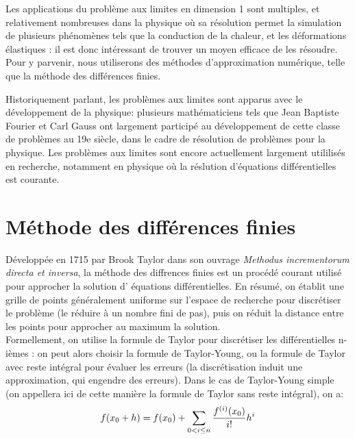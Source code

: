 \documentclass[12pt]{article}
\begin{document}
Les applications du problème aux limites en dimension 1 sont multiples, et relativement nombreuses dans la physique où sa résolution permet la simulation de plusieurs phénomènes tels que la conduction de la chaleur, et les déformations élastiques : il est donc intéressant de trouver un moyen efficace de les résoudre. Pour y parvenir, nous utiliserons des méthodes d'approximation numérique, telle que la méthode des différences finies.

Historiquement parlant, les problèmes aux limites sont apparus avec le développement de la physique: plusieurs mathématiciens tels que Jean Baptiste Fourier et Carl Gauss ont largement participé au développement de cette classe de problèmes au 19e siècle, dans le cadre de résolution de problèmes pour la physique.
Les problèmes aux limites sont encore actuellement largement utililisés en recherche, notamment en physique où la réslution d'équations différentielles est courante.



\section{Méthode des différences finies}

\quad Développée en 1715 par Brook Taylor dans son ouvrage \emph{Methodus incrementorum directa et inversa}, la méthode des diffrences finies est un procédé courant utilisé pour approcher la solution d' équations différentielles. En résumé, on établit une grille de points généralement uniforme sur l'espace de recherche pour discrétiser le problème (le réduire à un nombre fini de pas), puis on réduit la distance entre les points pour approcher au maximum la solution. \\
\quad Formellement, on utilise la formule de Taylor pour discrétiser les différentielles n-ièmes : on peut alors choisir la formule de Taylor-Young, ou la formule de Taylor avec reste intégral pour évaluer les erreurs (la discrétisation induit une approximation, qui engendre des erreurs).
Dans le cas de Taylor-Young simple (on appellera ici de cette manière la formule de Taylor sans reste intégral), on a:
$$
f\relax(x_0 + h) = f\relax(x_0) + \sum_{\substack{0<i\le n}}\frac{f^{(i)}\relax(x_0)}{i!}h^i
$$ 
\end{document}
